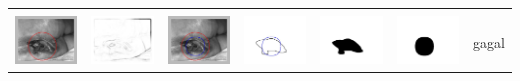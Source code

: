 \begin{table}[H]
\begin{tabular}{|m{0.7in}|m{0.7in}|m{0.7in}|m{0.7in}|m{0.7in}|m{0.7in}|m{0.7in}|}
		&  &  & & & &  \\
		\includegraphics[width=0.7in]{dataset/dataset_3/luka_hitam/ready/20_integer_init.jpg}&
		\includegraphics[width=0.7in]{dataset/dataset_3/luka_hitam/ready/20_integer_ext.jpg}&
		\includegraphics[width=0.7in]{dataset/dataset_3/luka_hitam/ready/20_integer_result.jpg}&
		\includegraphics[width=0.7in]{dataset/dataset_3/luka_hitam/ready/20_gt_r_integer.jpg}&
		\includegraphics[width=0.7in]{dataset/dataset_3/luka_hitam/ready/20_r.jpg}&
		\includegraphics[width=0.7in]{dataset/dataset_3/luka_hitam/ready/20_integer_r.jpg}&
		gagal\\
		\hline
		
	\end{tabular}
\end{table}

